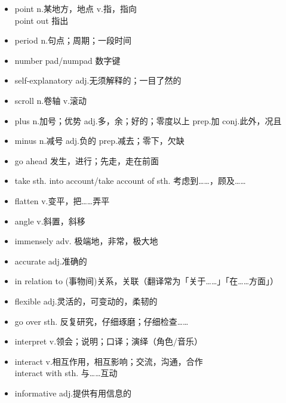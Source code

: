 \begin{multicols}{2}
\begin{itemize}
        \item point n.某地方，地点 v.指，指向\\point out 指出
        \item period n.句点；周期；一段时间
        \item number pad/numpad 数字键
        \item self-explanatory adj.无须解释的；一目了然的
        \item scroll n.卷轴 v.滚动
        \item plus n.加号；优势 adj.多，余；好的；零度以上 prep.加 conj.此外，况且
        \item minus n.减号 adj.负的 prep.减去；零下，欠缺
        \item go ahead 发生，进行；先走，走在前面
        \item take sth. into account/take account of sth. 考虑到……，顾及……
        \item flatten v.变平，把……弄平
        \item angle v.斜置，斜移
        \item immensely adv. 极端地，非常，极大地
        \item accurate adj.准确的
        \item in relation to (事物间)关系，关联（翻译常为「关于……」「在……方面」）
        \item flexible adj.灵活的，可变动的，柔韧的
        \item go over sth. 反复研究，仔细琢磨；仔细检查……
        \item interpret v.领会；说明；口译；演绎（角色/音乐）
        \item interact v.相互作用，相互影响；交流，沟通，合作\\interact with sth. 与……互动
        \item informative adj.提供有用信息的
    \end{itemize}
\end{multicols}
